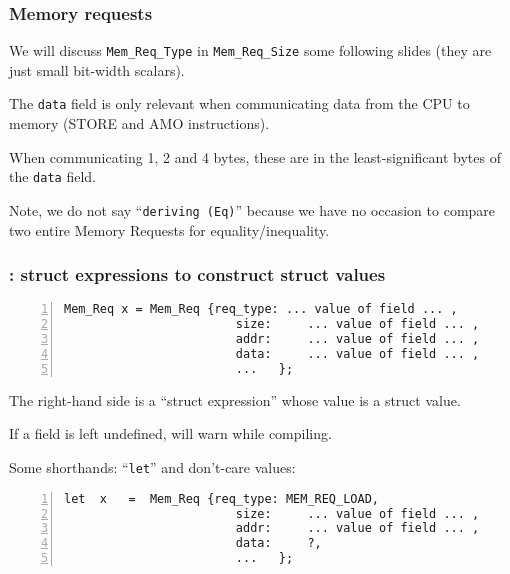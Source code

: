 \begin{frame}[fragile]
\frametitle{Memory requests}

\footnotesize


\vspace{2ex}

We will discuss {\tt Mem\_Req\_Type} in {\tt Mem\_Req\_Size} some
following slides (they are just small bit-width scalars).

\vspace{1ex}

The {\tt data} field is only relevant when communicating data from the
CPU to memory (STORE and AMO instructions).

\vspace{1ex}

When communicating 1, 2 and 4 bytes, these are in the
least-significant bytes of the {\tt data} field.

\PAUSE{\vspace{4ex}}

Note, we do not say ``{\tt deriving (Eq)}'' because we have no
occasion to compare two entire Memory Requests for
equality/inequality.

\end{frame}


\begin{frame}[fragile]
\frametitle{{\BSV}: struct expressions to construct struct values}

\footnotesize

\begin{Verbatim}[frame=single, numbers=left]
   Mem_Req x = Mem_Req {req_type: ... value of field ... ,
                        size:     ... value of field ... ,
                        addr:     ... value of field ... ,
                        data:     ... value of field ... ,
                        ...   };
\end{Verbatim}
The right-hand side is a ``struct expression'' whose value is a struct value.

\vspace{1ex}

If a field is left undefined, {\bsc} will warn while compiling.

\PAUSE{\vspace*{4ex}}

Some shorthands: ``{\tt let}'' and don't-care values:

\vspace*{2ex}

\begin{Verbatim}[frame=single, numbers=left]
   let  x   =  Mem_Req {req_type: MEM_REQ_LOAD,
                        size:     ... value of field ... ,
                        addr:     ... value of field ... ,
                        data:     ?,
                        ...   };
\end{Verbatim}

\end{frame}

